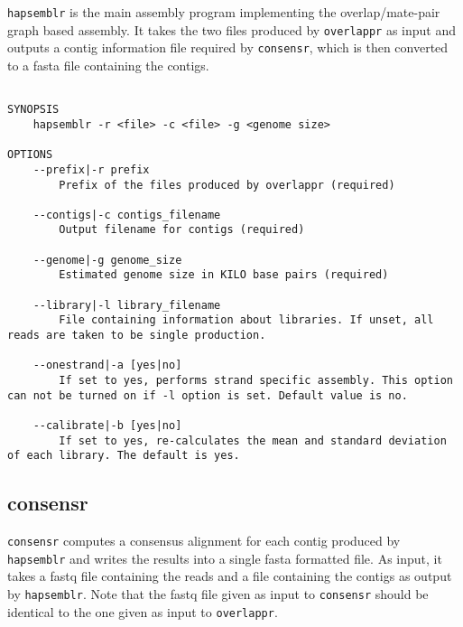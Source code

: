 \documentclass[12pt,a4paper]{report}
\begin{document}
\texttt{hapsemblr} is the main assembly program implementing the overlap/mate-pair graph based assembly. It takes the two files produced by \texttt{overlappr} as input and outputs a contig information file required by \texttt{consensr}, which is then converted to a fasta file containing the contigs.

\begin{lstlisting}

SYNOPSIS
    hapsemblr -r <file> -c <file> -g <genome size>

OPTIONS 
    --prefix|-r prefix
        Prefix of the files produced by overlappr (required) 

    --contigs|-c contigs_filename 
        Output filename for contigs (required) 

    --genome|-g genome_size 
        Estimated genome size in KILO base pairs (required) 

    --library|-l library_filename 
        File containing information about libraries. If unset, all reads are taken to be single production. 

    --onestrand|-a [yes|no] 
        If set to yes, performs strand specific assembly. This option can not be turned on if -l option is set. Default value is no. 

    --calibrate|-b [yes|no] 
        If set to yes, re-calculates the mean and standard deviation of each library. The default is yes. 

\end{lstlisting}

\subsection{consensr}

\texttt{consensr} computes a consensus alignment for each contig produced by \texttt{hapsemblr} and writes the results into a single fasta formatted file. As input, it takes a fastq file containing the reads and a file containing the contigs as output by \texttt{hapsemblr}. Note that the fastq file given as input to \texttt{consensr} should be identical to the one given as input to \texttt{overlappr}.
\end{document}
